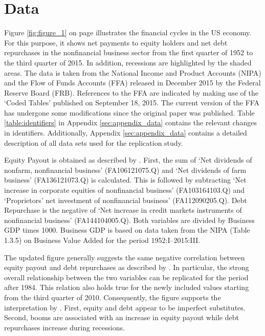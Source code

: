 \section{Data}
\label{sec:data}



Figure \ref{fig:figure_1} on page \pageref{fig:figure_1} illustrates the financial cycles in the US economy. For this purpose, it shows net payments to equity holders and net debt repurchases in the nonfinancial business sector from the first quarter of 1952 to the third quarter of 2015. In addition, recessions are highlighted by the shaded areas. The data is taken from the National Income and Product Accounts (NIPA) and the Flow of Funds Accounts (FFA) released in December 2015 by the Federal Reserve Board (FRB). References to the FFA are indicated by making use of the ‘Coded Tables’ published on September 18, 2015. The current version of the FFA has undergone some modifications since the original paper was published. Table \ref{table:identifiers} in Appendix \ref{sec:appendix_data} contains the relevant changes in identifiers. Additionally, Appendix \ref{sec:appendix_data} contains a detailed description of all data sets used for the replication study.

Equity Payout is obtained as described by \citeauthor{JERMANNfinancial}. First, the sum of ‘Net dividends of nonfarm, nonfinancial business’ (FA106121075.Q) and ‘Net dividends of farm business’ (FA136121073.Q) is calculated. This is followed by subtracting ‘Net increase in corporate equities of nonfinancial business’ (FA103164103.Q) and ‘Proprietors’ net investment of nonfinancial business’ (FA112090205.Q). Debt Repurchase is the negative of ‘Net increase in credit markets instruments of nonfinancial business’ (FA144104005.Q). Both variables are divided by Business GDP times 1000. Business GDP is based on data taken from the NIPA (Table 1.3.5) on Business Value Added for the period 1952:I--2015:III.

The updated figure generally suggests the same negative correlation between equity payout and debt repurchases as described by \citeauthor{JERMANNfinancial}. In particular, the strong overall relationship between the two variables can be replicated for the period after 1984. This relation also holds true for the newly included values starting from the third quarter of 2010. 
Consequently, the figure supports the interpretation by \citeauthor{JERMANNfinancial}. First, equity and debt appear to be imperfect substitutes. Second, booms are associated with an increase in equity payout while debt repurchases increase during recessions.
